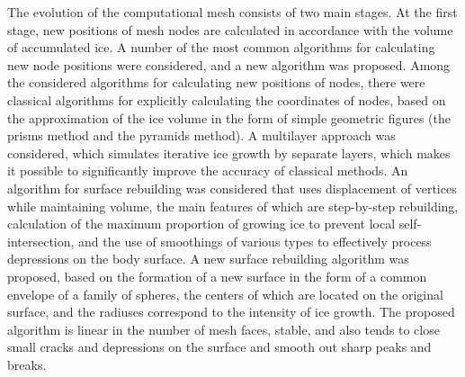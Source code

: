 \documentclass[
11pt,%
tightenlines,%
twoside,%
onecolumn,%
nofloats,%
nobibnotes,%
nofootinbib,%
superscriptaddress,%
noshowpacs,%
centertags]%
{revtex4-2}
\begin{document}
The evolution of the computational mesh consists of two main stages.
At the first stage, new positions of mesh nodes are calculated in accordance with the volume of accumulated ice.
A number of the most common algorithms for calculating new node positions were considered, and a new algorithm was proposed.
Among the considered algorithms for calculating new positions of nodes, there were classical algorithms for explicitly calculating the coordinates of nodes, based on the approximation of the ice volume in the form of simple geometric figures (the prisms method and the pyramids method).
A multilayer approach was considered, which simulates iterative ice growth by separate layers, which makes it possible to significantly improve the accuracy of classical methods.
An algorithm for surface rebuilding was considered that uses displacement of vertices while maintaining volume, the main features of which are step-by-step rebuilding, calculation of the maximum proportion of growing ice to prevent local self-intersection, and the use of smoothings of various types to effectively process depressions on the body surface.
A new surface rebuilding algorithm was proposed, based on the formation of a new surface in the form of a common envelope of a family of spheres, the centers of which are located on the original surface, and the radiuses correspond to the intensity of ice growth.
The proposed algorithm is linear in the number of mesh faces, stable, and also tends to close small cracks and depressions on the surface and smooth out sharp peaks and breaks.
\end{document}
